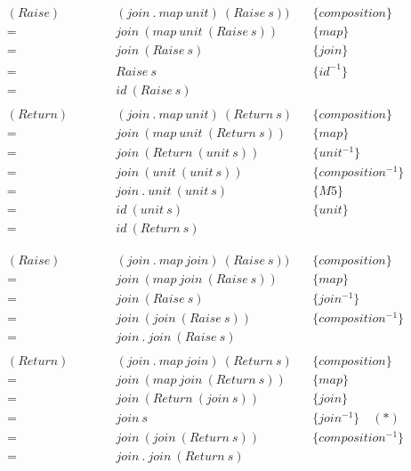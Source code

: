 \begin{framed}
  \begin{align*}
      (Raise)\qquad
      &\quad (join\ .\ map\ unit)\ (Raise\ s)) && \{composition\}\\
      =&\quad join\ (map\ unit\ (Raise\ s)) && \{map\}\\
      =&\quad join\ (Raise\ s) && \{join\}\\
      =&\quad Raise\ s\ && \{id^{-1}\}\\
      =&\quad id\ (Raise\ s) \\\\
      (Return)\qquad
      &\quad (join\ .\ map\ unit)\ (Return\ s) && \{composition\}\\
      =&\quad join\ (map\ unit\ (Return\ s)) && \{map\}\\
      =&\quad join\ (Return\ (unit\ s)) && \{unit^{-1}\}\\
      =&\quad join\ (unit\ (unit\ s)) && \{composition^{-1}\}\\
      =&\quad join\ .\ unit\ (unit\ s) && \{M5\}\\
      =&\quad id\ (unit\ s) && \{unit\}\\
      =&\quad id\ (Return\ s)
  \end{align*}

  \begin{align*}
      (Raise)\qquad
      &\quad (join\ .\ map\ join)\ (Raise\ s)) && \{composition\}\\
      =&\quad join\ (map\ join\ (Raise\ s)) && \{map\}\\
      =&\quad join\ (Raise\ s) && \{join^{-1}\}\\
      =&\quad join\ (join\ (Raise\ s)) && \{composition^{-1}\}\\
      =&\quad join\ .\ join\ (Raise\ s) \\\\
      (Return)\qquad
      &\quad (join\ .\ map\ join)\ (Return\ s) && \{composition\}\\
      =&\quad join\ (map\ join\ (Return\ s)) && \{map\}\\
      =&\quad join\ (Return\ (join\ s)) && \{join\}\\
      =&\quad join\ s && \{join^{-1}\}\quad(*)\\
      =&\quad join\ (join\ (Return\ s)) && \{composition^{-1}\}\\
      =&\quad join\ .\ join\ (Return\ s)
  \end{align*}
\end{framed}

